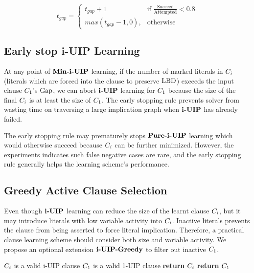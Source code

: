 \[
    t_{gap}=
\begin{cases}
    t_{gap} + 1& \text{if } \frac{\text{Succeed}}{\text{Attempted}} < 0.8\\
    max(t_{gap} - 1, 0),              & \text{otherwise}
\end{cases}
\]

\subsection{Early stop i-UIP Learning}
At any point of $\textbf{Min-i-UIP}$ learning, if the number of marked literals in $C_{i}$ (literals which are forced into the clause to preserve $\text{LBD}$) exceeds the input clause $C_{1}$'s $\text{Gap}$, we can abort $\textbf{i-UIP}$ learning for $C_{1}$ because the size of the final $C_{i}$ is at least the size of $C_{1}$.  The early stopping rule prevents solver from wasting time on traversing a large implication graph when $\textbf{i-UIP}$ has already failed. 

The early stopping rule may prematurely stops $\textbf{Pure-i-UIP}$ learning which would otherwise succeed because $C_{i}$ can be further minimized. However, the experiments indicates such false negative cases are rare, and the early stopping rule generally helps the learning scheme's performance.

\subsection{Greedy Active Clause Selection} \label{sec:greedy}
Even though $\textbf{i-UIP}$ learning can reduce the size of the learnt clause $C_{i}$, but it may introduce literals with low variable activity into $C_{i}$.  Inactive literals prevents the clause from being asserted to force literal implication. Therefore, a practical clause learning scheme should consider both size and variable activity. We propose an optional extension $\IUIPGreedy$ to filter out inactive $C_{1}$.  

\begin{algorithm}[t]
\caption{$\IUIPGreedy$}\label{alg:greedySelection}
\begin{algorithmic}[1]
\Require  $C_{i}$ is a valid i-UIP clause
\Require  $C_{1}$ is a valid 1-UIP clause
\Procedure{$\IUIPGreedy$}{$\iUIPClause, \oneUIPClause$} 
    \label{ln:checkSizeAndActivity}
    \State \textbf{return} $C_{i}$
\Else
    \State \textbf{return} $C_{1}$
\EndIf  \label{ln:cSizeCheck}
\EndProcedure
\end{algorithmic}
\end{algorithm}

